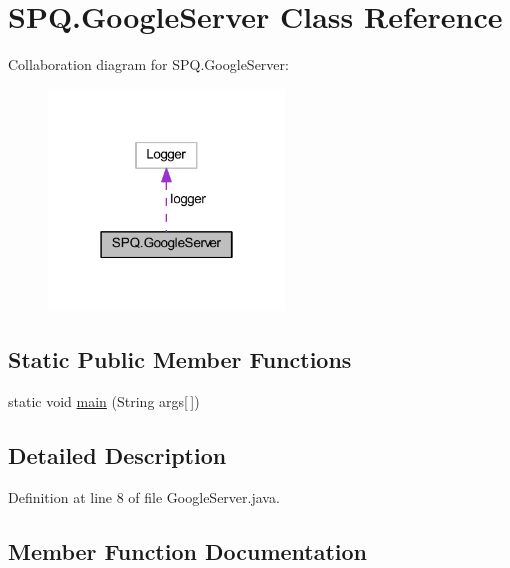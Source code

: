 \hypertarget{class_s_p_q_1_1_google_server}{}\section{S\+P\+Q.\+Google\+Server Class Reference}
\label{class_s_p_q_1_1_google_server}


Collaboration diagram for S\+P\+Q.\+Google\+Server\+:
\nopagebreak
\begin{figure}[H]
\begin{center}
\leavevmode
\includegraphics[width=178pt]{class_s_p_q_1_1_google_server__coll__graph}
\end{center}
\end{figure}
\subsection*{Static Public Member Functions}
\begin{DoxyCompactItemize}
\item 
static void \mbox{\hyperlink{class_s_p_q_1_1_google_server_a274b82865fbf2ccda7ddafe6ae442b15}{main}} (String args\mbox{[}$\,$\mbox{]})
\end{DoxyCompactItemize}


\subsection{Detailed Description}


Definition at line 8 of file Google\+Server.\+java.



\subsection{Member Function Documentation}
\mbox{\label{class_s_p_q_1_1_google_server_a274b82865fbf2ccda7ddafe6ae442b15}} 
